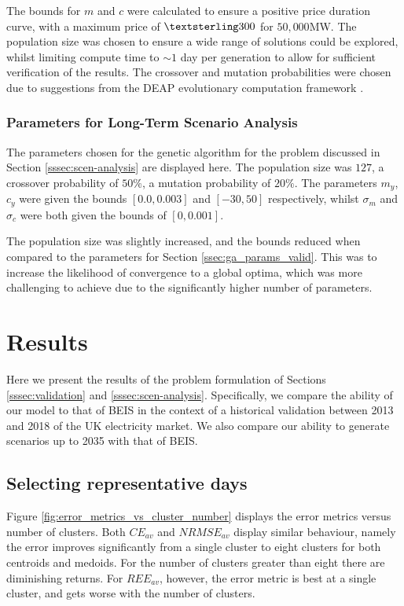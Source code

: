 The bounds for $m$ and $c$ were calculated to ensure a positive price duration curve, with a maximum price of $\textsterling300$ for $50,000$MW. The population size was chosen to ensure a wide range of solutions could be explored, whilst limiting compute time to ${\sim}1$ day per generation to allow for sufficient verification of the results. The crossover and mutation probabilities were chosen due to suggestions from the DEAP evolutionary computation framework \cite{Gagn2012}.


\subsubsection{Parameters for Long-Term Scenario Analysis}

The parameters chosen for the genetic algorithm for the problem discussed in Section \ref{sssec:scen-analysis} are displayed here. The population size was $127$, a crossover probability of $50\%$, a mutation probability of $20\%$. The parameters $m_y$, $c_y$ were given the bounds $[0.0, 0.003]$ and $[-30, 50]$ respectively, whilst $\sigma_m$ and $\sigma_c$ were both given the bounds of $[0, 0.001]$.

The population size was slightly increased, and the bounds reduced when compared to the parameters for Section \ref{ssec:ga_params_valid}. This was to increase the likelihood of convergence to a global optima, which was more challenging to achieve due to the significantly higher number of parameters.


\section{Results}
\label{sec:results}

Here we present the results of the problem formulation of Sections \ref{sssec:validation} and  \ref{sssec:scen-analysis}. Specifically, we compare the ability of our model to that of BEIS in the context of a historical validation between 2013 and 2018 of the UK electricity market. We also compare our ability to generate scenarios up to 2035 with that of BEIS. 

\subsection{Selecting representative days}
\label{ssec:res_repr_days}

Figure \ref{fig:error_metrics_vs_cluster_number} displays the error metrics versus number of clusters. Both $CE_{av}$ and $NRMSE_{av}$ display similar behaviour, namely the error improves significantly from a single cluster to eight clusters for both centroids and medoids. For the number of clusters greater than eight there are diminishing returns. For $REE_{av}$, however, the error metric is best at a single cluster, and gets worse with the number of clusters. 



